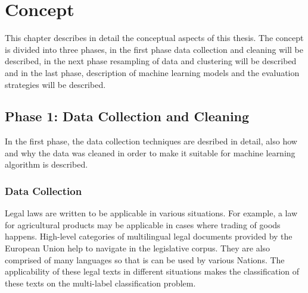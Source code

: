 \chapter{Concept}
\label{ch:concept}

This chapter describes in detail the conceptual aspects of this thesis. The concept is divided into three phases, in the first phase data collection and cleaning will be described, in the next phase resampling of data and clustering will be described and in the last phase, description of machine learning models and the evaluation strategies will be described.

\section{Phase 1: Data Collection and Cleaning}
In the first phase, the data collection techniques are desribed in detail, also how and why the data was cleaned in order to make it suitable for machine learning algorithm is described. 

\subsection*{Data Collection}
Legal laws are written to be applicable in various situations. For example, a law for agricultural products may be applicable in cases where trading of goods happens.  High-level categories of multilingual legal documents provided by the European Union help to navigate in the legislative corpus. They are also comprised of many languages so that is can be used by various Nations. The applicability of these legal texts in different situations makes the classification of these texts on the multi-label classification problem.

